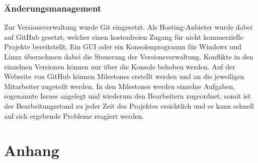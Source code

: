 \subsubsection{Änderungsmanagement}
Zur Versionsverwaltung wurde Git eingesetzt. Als Hosting-Anbieter wurde dabei auf GitHub gesetzt, welcher einen kostenfreien Zugang für nicht kommerzielle Projekte bereitstellt. Ein \ac{GUI} oder ein Konsolenprogramm für Windows und Linux übernehmen dabei die Steuerung der Versionsverwaltung. Konflikte in den einzelnen Versionen können nur über die Konsole behoben werden. Auf der Webseite von GitHub können Milestones erstellt werden und an die jeweiligen Mitarbeiter zugeteilt werden. In den Milestones werden einzelne Aufgaben, sogenannte Issues angelegt und wiederum den Bearbeitern zugeordnet, somit ist der Bearbeitungsstand zu jeder Zeit des Projektes ersichtlich und es kann schnell auf sich ergebende Probleme reagiert werden.






\section{Anhang}


